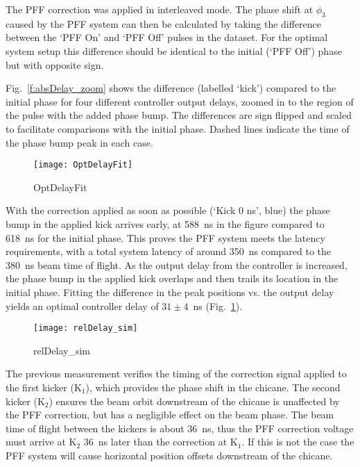 The PFF correction was applied in interleaved mode. The phase shift at 
\(\phi_3\) caused by the PFF system can then be calculated by taking the 
difference between the `PFF On' and `PFF Off' pulses in the dataset. For the 
optimal system setup this difference should be identical to the initial (`PFF 
Off') phase but with opposite sign.

Fig.~\ref{f:absDelay_zoom} shows the difference (labelled `kick') compared to 
the initial phase for four different controller output delays, zoomed in to the 
region of the pulse with the added phase bump. The differences are sign flipped 
and scaled to facilitate comparisons with the initial phase. Dashed lines 
indicate the time of the phase bump peak in each case. 

\begin{figure}
 \centering
  \texttt{[image: OptDelayFit]}%
  \caption{\label{f:OptDelayFit} OptDelayFit
  }
\end{figure}

With the correction applied as soon as possible (`Kick 0 ns', blue) the phase 
bump in the applied kick arrives early, at 588~ns in the figure compared to 
618~ns for the initial phase. This proves the PFF system meets the latency 
requirements, with a total system latency of around 350~ns compared to the 
380~ns beam time of flight. As the output delay from the controller is 
increased, the phase bump in the applied kick overlaps and then trails its 
location in the initial phase. Fitting the difference in the peak positions vs. 
the output delay yields an optimal controller delay of \(31\pm4\)~ns 
(Fig.~\ref{f:OptDelayFit}).

\begin{figure}
 \centering
  \texttt{[image: relDelay\_sim]}%
  \caption{\label{f:relDelay_sim} relDelay\_sim
  }
\end{figure}

The previous measurement verifies the timing of the correction signal applied 
to the first kicker (\(\mathrm{K_1}\)), which provides the phase shift in the 
chicane. The second kicker (\(\mathrm{K_2}\)) ensures the beam orbit downstream 
of the chicane is unaffected by the PFF correction, but has a negligible effect 
on the beam phase. The beam time of flight between the kickers is about 36~ns, 
thus the PFF correction voltage must arrive at \(\mathrm{K_2}\) 36~ns later 
than the correction at \(\mathrm{K_1}\). If this is not the case the PFF system 
will cause horizontal position offsets downstream of the chicane.

